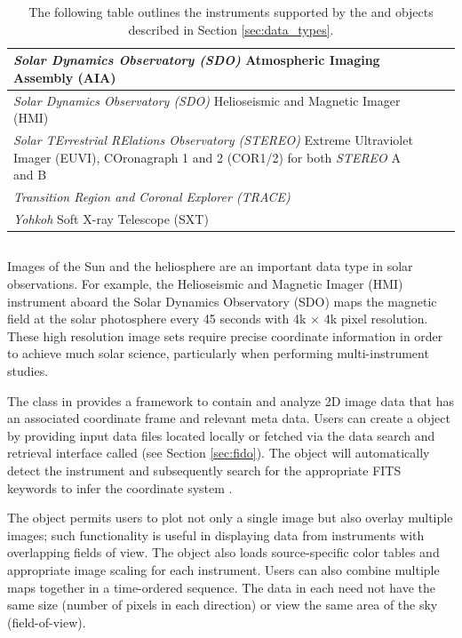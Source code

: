 \begin{table}
\begin{center}
\begin{tabular}{|p{12cm}|c|c|}
\hline
\textit{Solar Dynamics Observatory (SDO)} Atmospheric Imaging Assembly (AIA) & \citep{lemen2012} \\
\hline
\textit{Solar Dynamics Observatory (SDO)} Helioseismic and Magnetic Imager (HMI) & \citep{schou12}  \\
\hline
\textit{Solar TErrestrial RElations Observatory (STEREO)} Extreme Ultraviolet Imager (EUVI), COronagraph 1 and 2 (COR1/2) for both \textit{STEREO} A and B & \citep{howard2008sun} \\
\hline
\textit{Transition Region and Coronal Explorer (TRACE)}  & \citep{handy99}  \\
\hline
\textit{Yohkoh} Soft X-ray Telescope (SXT) & \citep{tsuneta1991soft}  \\
\hline
\end{tabular}
\end{center}
\caption{The following table outlines the instruments supported by the \Timeseries and \Map objects described in Section \ref{sec:data_types}.}
\label{tab:instruments}
\end{table}

\subsection{\Map}
\label{sec:map}
Images of the Sun and the heliosphere are an important data type in solar observations. 
For example, the Helioseismic and Magnetic Imager (HMI) instrument aboard the Solar Dynamics Observatory (SDO) maps the magnetic field at the solar photosphere every 45 seconds with 4k $\times$ 4k pixel resolution. 
These high resolution image sets require precise coordinate information in order to achieve much solar science, particularly when performing multi-instrument studies. 

The \Map class in \sunpypkg provides a framework to contain and analyze 2D image data that has an associated coordinate frame and relevant meta data. 
Users can create a \Map object by providing input data files located locally or fetched via the \sunpypkg data search and retrieval interface called \Fido (see Section \ref{sec:fido}). The \Map object will automatically detect the instrument and subsequently search for the appropriate FITS keywords to infer the coordinate system \citep{refId0, 2006A&A...449..791T}.

The \Map object permits users to plot not only a single image but also overlay multiple images; such functionality is useful in displaying data from instruments with overlapping fields of view. The \Map object also loads source-specific color tables and appropriate image scaling for each instrument.
Users can also combine multiple maps together in a time-ordered sequence. The data in each \Map need not have the same size (number of pixels in each direction) or view the same area of the sky (field-of-view). 

